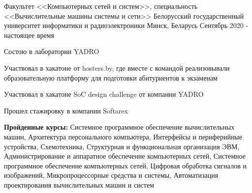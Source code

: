 

\begin{cventries}

  \cventry
    {Факультет <<Компьютерных сетей и систем>>,
    специальность <<Вычислительные машины системы и сети>>} %
    {Белорусский государственный университет информатики и радиоэлектроники} %
    {Минск, Беларусь} %
    {Сентябрь 2020 - настоящее время} %
    {
      \begin{cvitems} %
        \item {Состою в лаборатории YADRO}
        \item {Участвовал в хакатоне от hosters.by, где вместе с командой реализовывали образовательную 
              платформу для подготовки абитуриентов к экзаменам}
        \item {Участвовал в хакатоне SoC design challenge от компании YADRO}
        \item {Прошел стажировку в компании Softarex}
        \item {\textbf{Пройденные курсы:} 
              Системное программное обеспечение вычислительных машин,
              Архитектура персонального компьютера,
              Интерфейсы и периферийные устройства,
              Схемотехника,
              Структурная и функциональная организация ЭВМ,
              Администрирование и аппаратное обеспечение компьютерных сетей,
              Системное программное обеспечение компьютерных сетей,
              Цифровая обработка сигналов и изображений,
              Микропроцессорные средства и системы,
              Автоматизация проектирования вычислительных машин и систем
              }
      \end{cvitems}
    }
\end{cventries}
